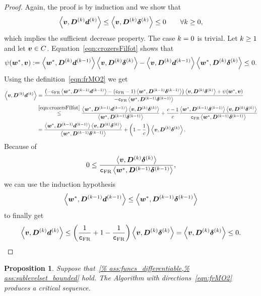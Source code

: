 \documentclass{article}
\theoremstyle{plain}
\newtheorem{proposition}[theorem]{Proposition}
\theoremstyle{definition}
\begin{document}
\begin{proof}
	Again, the proof is by induction and we show that
	$$
	\mul{\ve v}{\ve D\KK \vdK}
	\leq
	\mul{\ve v}{\ve D\KK \sdK} \leq 0
	\qquad\forall \kk \geq 0,
	$$
	which implies the sufficient decrease property.
	The case $\kk = 0$ is trivial.
	Let $\kk \geq 1$ and let $\ve v \in C$. 
	Equation~\eqref{eqn:crozersFilfot} shows that
	$$
	\psi(\ve w^*, \ve v)
	:=
	\mul{\ve w^*}{\ve D\KK \vdKp}
	\mul{\ve v}{\ve D\KK \sdK}
	-
	\mul{\ve v}{\ve D\KK \vdKp}
	\mul{\ve w^*}{\ve D\KK \sdK}
	\leq 0.
	$$
	Using the definition~\eqref{eqn:frMO2} we get
	\begin{align*}
		\mul{\ve v}{\ve D\KK \vdK}
		&=
		\frac{
			\left(
				-
					\constFR \mul{\ve w^*}{\ve D\KKp \vdKp}
				-
					(\constFR-1) \mul{\ve w^*}{\ve D\KKp \sdKp}
			\right)
				\mul{\ve v }{\ve D\KK \sdK}
				+	
					\psi(\ve w^*, \ve v)
		}{
			-\constFR \mul{\ve w^*}{\ve D\KKp \sdKp}
		}
		\\
		&\stackrel{\eqref{eqn:crozersFilfot}}
		\leq 
		\frac{
			\mul{\ve w^*}{\ve D\KKp \vdKp}
			\mul{\ve v }{\ve D\KK \sdK}
		}{
			\mul{\ve w^*}{\ve D\KKp \sdKp}
		}
		+
		\frac{c-1}{c}
		\frac{
			\mul{\ve w^*}{\ve D\KKp \sdKp}
			\mul{\ve v }{\ve D\KK \sdK}
		}{
			\constFR \mul{\ve w^*}{\ve D\KKp \sdKp}
		}
		\\
		&=
		\frac{
			\mul{\ve w^*}{\ve D\KKp \vdKp}
			\mul{\ve v }{\ve D\KK \sdK}
		}{
			\mul{\ve w^*}{\ve D\KKp \sdKp}
		}
		+
		\left(1 - \frac{1}{c}\right)
			\mul{\ve v }{\ve D\KK \sdK}
		.
	\end{align*}
	Because of 
	$$0 \leq 
	\frac{\mul{\ve v}{\ve D\KK\sdK}}{\constFR \mul{\ve w^*}{\ve D\KKp \sdKp}},$$
	we can use the induction hypothesis 
	$$
	\mul{\ve w^*}{\ve D\KKp \vdKp}
	\leq
	\mul{\ve w^*}{\ve D\KKp \sdKp}
	$$
	to finally get
	$$
	\mul{\ve v}{\ve D\KK \vdK}
	\leq
		\left(
			\frac{1}{\constFR} + 1 -\frac{1}{\constFR}
		\right)
		\mul{\ve v }{\ve D\KK \sdK}
	=
		\mul{\ve v }{\ve D\KK \sdK} \leq 0.
	$$
\end{proof}

\begin{proposition}\label{thm:frMO2Convergence}
Suppose that~\cref{%
ass:funcs_differentiable,%
ass:sublevelset_bounded}
hold.
The Algorithm with directions~\eqref{eqn:frMO2}
produces a critical sequence.
\end{proposition}
\end{document}

